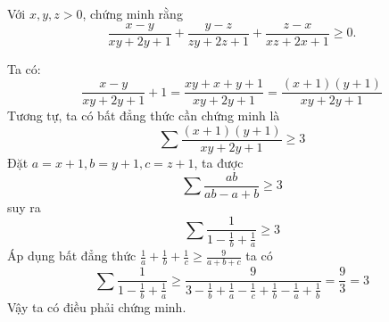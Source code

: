 \begin{problem}

Với $x, y, z > 0$, chứng minh rằng
$$
	\frac{x - y}{xy + 2y + 1} + \frac{y - z}{zy + 2z + 1} + \frac{z - x}{xz + 2x + 1} \ge 0.
$$
\solution

Ta có:
$$
	\frac{x - y}{xy + 2y + 1} + 1 = \frac{xy + x + y + 1}{xy + 2y + 1} = \frac{(x + 1)(y + 1)}{xy + 2y + 1}
$$
Tương tự, ta có bất đẳng thức cần chứng minh là
$$
	\sum \frac{(x + 1)(y + 1)}{xy + 2y + 1} \ge 3
$$
Đặt $a = x + 1, b = y + 1, c = z + 1$, ta được
$$
	\sum \frac{ab}{ab - a + b} \ge 3
$$
suy ra
$$
	\sum \frac{1}{1 - \frac{1}{b} + \frac{1}{a}} \ge 3
$$
Áp dụng bất đẳng thức $\displaystyle \frac{1}{a} + \frac{1}{b} + \frac{1}{c} \ge \frac{9}{a + b + c}$ ta có
$$
	\sum \frac{1}{1 - \frac{1}{b} + \frac{1}{a}} \ge \frac{9}{3 - \frac{1}{b} + \frac{1}{a} - \frac{1}{c} + \frac{1}{b} - \frac{1}{a} + \frac{1}{b}} = \frac{9}{3} = 3
$$
Vậy ta có điều phải chứng minh.

\end{problem}